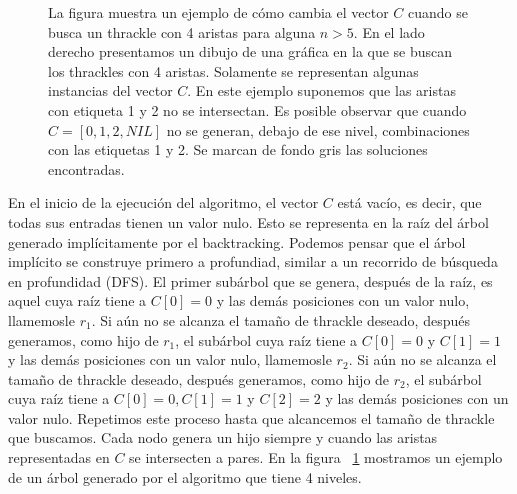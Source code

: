 \begin{figure}[p]
    \caption{La figura muestra un ejemplo de cómo cambia el vector $C$ cuando se busca un thrackle
    con 4 aristas para alguna $n>5$. En el lado derecho presentamos un dibujo de una gráfica en la
    que se buscan los thrackles con 4 aristas. Solamente se representan algunas instancias del
    vector $C$. En este ejemplo suponemos que las aristas con etiqueta 1 y 2 no se
    intersectan. Es posible observar que cuando $C=[0,1,2,NIL]$ no se generan, debajo de ese nivel,
    combinaciones con las etiquetas 1 y 2. Se marcan de fondo gris las soluciones encontradas.
    }
    \label{fig:ejemplo_backtracking}
  \end{figure}
  En el  inicio de la ejecución del algoritmo, el vector $C$ está vacío, es
  decir, que  todas sus entradas tienen un valor nulo. Esto se representa en
  la raíz del árbol generado implícitamente por el backtracking. Podemos pensar que el
  árbol implícito se construye primero a profundiad, similar a un recorrido de búsqueda
  en profundidad (DFS). El primer subárbol que se genera, después de la raíz, es aquel
  cuya raíz tiene a $C[0]=0$ y las demás posiciones con un valor nulo, llamemosle $r_1$.
  Si aún no se alcanza el tamaño de thrackle deseado, después generamos, como hijo de
  $r_1$, el subárbol cuya raíz tiene a $C[0]=0$ y $C[1]=1$ y las demás posiciones con un
  valor nulo, llamemosle $r_2$. Si aún no se alcanza el tamaño de thrackle deseado,
  después generamos, como hijo de $r_2$, el subárbol cuya raíz tiene a $C[0]=0,C[1]=1$ y
  $C[2]=2$ y las demás posiciones con un valor nulo. Repetimos este proceso hasta que
  alcancemos el tamaño de thrackle que buscamos. Cada nodo genera un hijo siempre y
  cuando las aristas representadas en $C$ se intersecten a pares. En la figura
  ~\ref{fig:ejemplo_backtracking} mostramos un ejemplo de un árbol generado por el
  algoritmo que tiene 4 niveles.

